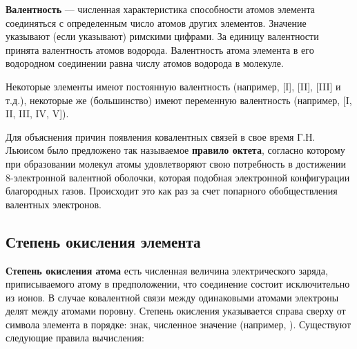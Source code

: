 \textbf{Валентность} --- численная характеристика способности атомов элемента соединяться с определенным число атомов других элементов. Значение указывают (если указывают) римскими цифрами. За единицу валентности принята валентность атомов водорода. Валентность атома элемента в его водородном соединении равна числу атомов водорода в молекуле.

Некоторые элементы имеют постоянную валентность (например, [\RN{1}], [\RN{2}], [\RN{3}] и т.д.), некоторые же (большинство) имеют переменную валентность (например, [\RN{1}, \RN{2}, \RN{3}, \RN{4}, \RN{5}]).

Для объяснения причин появления ковалентных связей в свое время Г.Н. Льюисом было предложено так называемое \textbf{правило октета}, согласно которому при образовании молекул атомы удовлетворяют свою потребность в достижении 8-электронной валентной оболочки, которая подобная электронной конфигурации благородных газов. Происходит это как раз за счет попарного обобществления валентных электронов.

\subsection{Степень окисления элемента}

\textbf{Степень окисления атома} есть численная величина электрического заряда, приписываемого атому в предположении, что соединение состоит исключительно из ионов. В случае ковалентной связи между одинаковыми атомами электроны делят между атомами поровну. Степень окисления указывается справа сверху от символа элемента в порядке: знак, численное значение (например, ). Существуют следующие правила вычисления:

